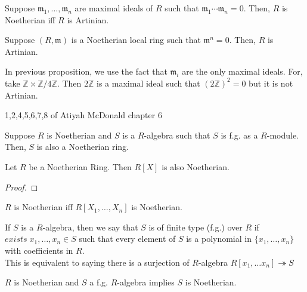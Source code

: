 \documentclass[oneside, 12pt]{scrbook}
\newcommand{\ZZ}{\mathbb Z}
\newcommand{\m}{\mathfrak{m}}
\theoremstyle{theorem}
\begin{document}
\begin{proposition}
Suppose $\m_{1}, \hdots ,\m_{n}$ are maximal ideals of $R$ such that $\m_{1} \cdots \m_{n} = 0$. Then, $R$ is Noetherian iff $R$ is Artinian.
\end{proposition}

\begin{corollary}
Suppose $(R,\m)$ is a Noetherian local ring such that $\m^n=0$. Then, $R$ is Artinian.
\end{corollary}

\begin{remark}
In previous proposition, we use the fact that $\m_{i}$ are the only maximal ideals. For, take $\ZZ \times \ZZ/4\ZZ$. Then $2\ZZ$ is a maximal ideal such that $(2\ZZ)^2=0$ but it is not Artinian.
\end{remark}

\begin{exercise}
1,2,4,5,6,7,8 of Atiyah McDonald chapter 6
\end{exercise}

\begin{lemma}
Suppose $R$ is Noetherian and $S$ is a $R$-algebra such that $S$ is f.g. as a $R$-module. Then, $S$ is also a Noetherian ring.
\end{lemma}

\begin{theorem}
Let $R$ be a Noetherian Ring. Then $R[X]$ is also Noetherian.
\end{theorem}

\begin{proof}

\end{proof}

\begin{corollary}
$R$ is Noetherian iff $R[X_{1}, \hdots ,X_{n}]$ is Noetherian.
\end{corollary}

\begin{definition}
If $S$ is a $R$-algebra, then we say that $S$ is of finite type (f.g.) over $R$ if $exists \; x_{1}, \hdots , x_{n} \in S$ such that every element of $S$ is a polynomial in $\{x_{1}, \hdots ,x_{n}\}$ with coefficients in $R$. \\

This is equivalent to saying there is a surjection of $R$-algebra $R[x_{1}, \hdots x_{n}] \twoheadrightarrow S$
\end{definition}

\begin{corollary}
$R$ is Noetherian and $S$ a f.g. $R$-algebra implies $S$ is Noetherian.
\end{corollary}
\end{document}
